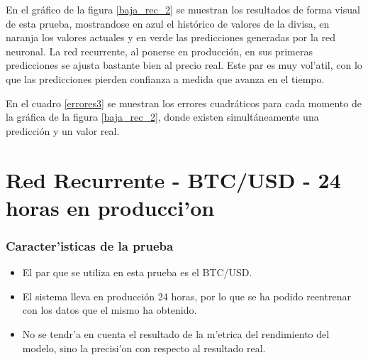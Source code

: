 En el gráfico de la figura \ref{baja_rec_2} se muestran los resultados de forma visual de esta prueba, mostrandose en azul el histórico de valores de la divisa, en naranja los valores actuales y en verde las predicciones generadas por la red neuronal. La red recurrente, al ponerse en producción, en sus primeras predicciones se ajusta bastante bien al precio real. Este par es muy vol'atil, con lo que las predicciones pierden confianza a medida que avanza en el tiempo.

En el cuadro  \ref{errores3} se muestran los errores cuadráticos para cada momento de la gráfica de la figura \ref{baja_rec_2}, donde existen simultáneamente una predicción y un valor real.




\clearpage



\section{Red Recurrente - BTC/USD - 24 horas en producci'on}\label{sec:pruebarecbaja_3}


\subsubsection*{Caracter'isticas de la prueba}
\begin{itemize}
\item El par que se utiliza en esta prueba es el BTC/USD.
\item El sistema lleva en producción 24 horas, por lo que se ha podido reentrenar con los datos que el mismo  ha obtenido.  
\item No se tendr'a en cuenta el resultado de la m'etrica del rendimiento del modelo, sino la precisi'on con respecto al resultado real.
\end{itemize}

